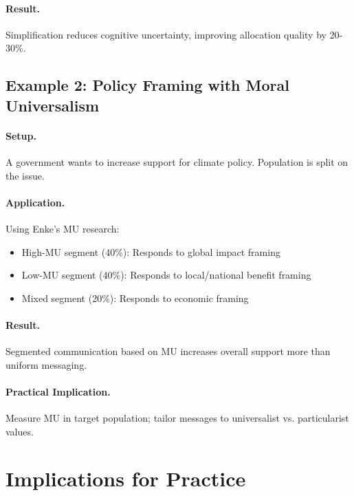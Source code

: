 \paragraph{Result.} Simplification reduces cognitive uncertainty, improving
allocation quality by 20-30\%.

\subsection{Example 2: Policy Framing with Moral Universalism}

\paragraph{Setup.} A government wants to increase support for climate policy.
Population is split on the issue.

\paragraph{Application.} Using Enke's MU research:
\begin{itemize}[nosep]
    \item High-MU segment (40\%): Responds to global impact framing
    \item Low-MU segment (40\%): Responds to local/national benefit framing
    \item Mixed segment (20\%): Responds to economic framing
\end{itemize}

\paragraph{Result.} Segmented communication based on MU increases overall
support more than uniform messaging.

\paragraph{Practical Implication.} Measure MU in target population; tailor
messages to universalist vs. particularist values.


\section{Implications for Practice}
\label{sec:enk-practice}

